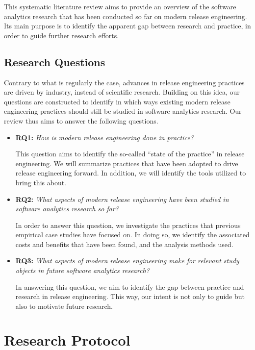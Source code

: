 \documentclass[]{book}
\begin{document}
This systematic literature review aims to provide an overview of the
software analytics research that has been conducted so far on modern
release engineering. Its main purpose is to identify the apparent gap
between research and practice, in order to guide further research
efforts.

\hypertarget{research-questions-1}{\subsection{Research
Questions}\label{research-questions-1}}

Contrary to what is regularly the case, advances in release engineering
practices are driven by industry, instead of scientific research.
Building on this idea, our questions are constructed to identify in
which ways existing modern release engineering practices should still be
studied in software analytics research. Our review thus aims to answer
the following questions.

\begin{itemize}
\item
  \textbf{RQ1:} \emph{How is modern release engineering done in
  practice?}

  This question aims to identify the so-called ``state of the practice''
  in release engineering. We will summarize practices that have been
  adopted to drive release engineering forward. In addition, we will
  identify the tools utilized to bring this about.
\item
  \textbf{RQ2:} \emph{What aspects of modern release engineering have
  been studied in software analytics research so far?}

  In order to answer this question, we investigate the practices that
  previous empirical case studies have focused on. In doing so, we
  identify the associated costs and benefits that have been found, and
  the analysis methods used.
\item
  \textbf{RQ3:} \emph{What aspects of modern release engineering make
  for relevant study objects in future software analytics research?}

  In answering this question, we aim to identify the gap between
  practice and research in release engineering. This way, our intent is
  not only to guide but also to motivate future research.
\end{itemize}

\section{Research Protocol}\label{research-protocol-3}
\end{document}
